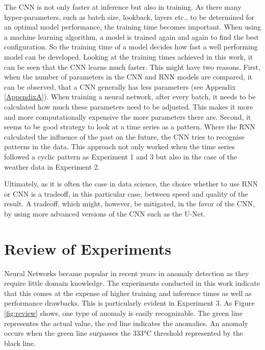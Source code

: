 The CNN is not only faster at inference but also in training. As there many hyper-parameters, such as batch size, lookback, layers etc., to be determined for an optimal model performance, the training time becomes important. When using a machine learning algorithm, a model is trained again and again to find the best configuration. So the training time of a model decides how fast a well performing model can be developed. Looking at the training times achieved in this work, it can be seen that the CNN learns much faster. This might have two reasons. First, when the number of parameters in the CNN and RNN models are compared, it can be observed, that a CNN generally has less parameters (see Appendix \ref{AppendixA}). When training a neural network, after every batch, it needs to be calculated how much these parameters need to be adjusted. This makes it more and more computationally expensive the more parameters there are. Second, it seems to be good strategy to look at a time series as a pattern. Where the RNN calculated the influence of the past on the future, the CNN tries to recognise patterns in the data. This approach not only worked when the time series followed a cyclic pattern as Experiment 1 and 3 but also in the case of the weather data in Experiment 2.     

Ultimately, as it is often the case in data science, the choice whether to use RNN or CNN is a tradeoff, in this particular case, between speed and quality of the result. A tradeoff, which might, however, be mitigated, in the favor of the CNN, by using more advanced versions of the CNN such as the U-Net.


\section{Review of Experiments}
Neural Networks became popular in recent years in anomaly detection as they require little domain knowledge. The experiments conducted in this work indicate that this comes at the expense of higher training and inference times as well as performance drawbacks. This is particularly evident in Experiment 3. As Figure \ref{fig:review} shows, one type of anomaly is easily recognizable. The green line representes the actual value, the red line indicates the anomalies. An anomaly occurs when the green line surpasses the 333°C threshold represented by the black line. 

